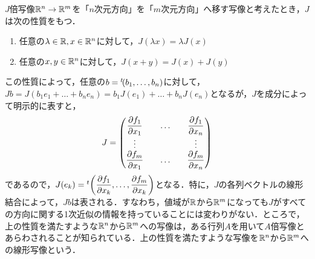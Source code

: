 $J$倍写像${\mathbb R}^n\rightarrow{\mathbb R}^m$を「$n$次元方向」を「$m$次元方向」へ移す写像と考えたとき，$J$は次の性質をもつ．
\begin{enumerate}
\renewcommand{\labelenumi}{(\theenumi)}
\item 任意の$\lambda\in{\mathbb R}, x\in{\mathbb R}^n$に対して，$J(\lambda x)=\lambda J(x)$
\item 任意の$x,y\in{\mathbb R}^n$に対して，$J(x+y)=J(x)+J(y)$
\end{enumerate}
この性質によって，任意の$b={}^t\!(b_1,\dots,b_n)$に対して，$Jb=J(b_1e_1+\dots+ b_ne_n)=b_1J(e_1)+\dots+b_nJ(e_n)$となるが，$J$を成分によって明示的に表すと，
$$
J=\begin{pmatrix} \displaystyle\frac{\partial f_1}{\partial x_1} && \dots && \displaystyle\frac{\partial f_1}{\partial x_n} \\ \vdots && && \vdots \\ \displaystyle\frac{\partial f_m}{\partial x_1} && \dots&&\displaystyle\frac{\partial f_m}{\partial x_n} \\ \end{pmatrix}
$$
であるので，$J(e_k)={}^t\!\left(\displaystyle\frac{\partial f_1}{\partial x_k},\dots,\displaystyle\frac{\partial f_m}{\partial x_k}\right)$となる．特に，$J$の各列ベクトルの線形結合によって，$Jb$は表される．すなわち，値域が${\mathbb R}$から${\mathbb R}^m$になっても$J$がすべての方向に関する1次近似の情報を持っていることには変わりがない．ところで，上の性質を満たすような${\mathbb R}^n$から${\mathbb R}^m$への写像は，ある行列$A$を用いて$A$倍写像とあらわされることが知られている．上の性質を満たすような写像を${\mathbb R}^n$から${\mathbb R}^m$への線形写像という．


